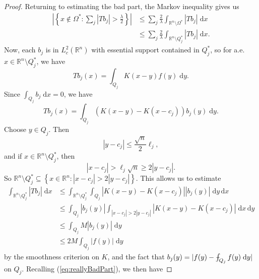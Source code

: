 \documentclass{book}
\newcommand{\bbR}{\mathbb{R}}
\renewcommand{\d}{\mathrm{d}}
\newcommand{\abs}[1]{\left\lvert {#1} \right\rvert}
\newcommand{\set}[1]{\left\{ {#1} \right\}}
\def\Xint#1{\mathchoice
{\XXint\displaystyle\textstyle{#1}}%
{\XXint\textstyle\scriptstyle{#1}}%
{\XXint\scriptstyle\scriptscriptstyle{#1}}%
{\XXint\scriptscriptstyle\scriptscriptstyle{#1}}%
\!\int}
\def\XXint#1#2#3{{\setbox0=\hbox{$#1{#2#3}{\int}$ }
\vcenter{\hbox{$#2#3$ }}\kern-.6\wd0}}
\def\dashint{\Xint-}
\theoremstyle{definition}
\theoremstyle{remark}
\numberwithin{equation}{chapter}
\begin{document}
\begin{proof}
    Returning to estimating the bad part, the Markov inequality gives us 
    \begin{equation} \begin{aligned} \label{eq:reallyBadPart}
        \abs{\set{ x \notin \Omega^* : \sum_j \abs{Tb_j} > \frac{\lambda}{2} }}
        &\leq \sum_{j} \frac{2}{\lambda} \int_{\bbR^n \setminus \Omega^*} \abs{Tb_j} \; \d{x} \\
        &\leq \sum_j \frac{2}{\lambda} \int_{\bbR^n \setminus Q_j^*} \abs{Tb_j} \; \d{x}.
    \end{aligned} \end{equation}
    Now, each $b_j$ is in $L^2_c(\bbR^n)$ with essential support contained in $Q_j^*$, so for a.e. $x \in \bbR^n \setminus Q_j^*$, we have 
    \begin{equation}
        Tb_j(x) = \int_{Q_j} K(x - y) f(y) \; \d{y}.
    \end{equation}
    Since $\int_{Q_j} b_j \; \d{x} = 0$, we have 
    \begin{equation}
        Tb_j(x) = \int_{Q_j} (K(x - y) - K(x - c_j)) b_j(y) \; \d{y}.
    \end{equation}
    Choose $y \in Q_j$. Then 
    \begin{equation}
        \abs{y - c_j} \leq \frac{\sqrt{n}}{2} \ell_j,
    \end{equation}
    and if $x \in \bbR^n \setminus Q_j^*$, then 
    \begin{equation}
        \abs{x - c_j} > \ell_j \sqrt{n} \geq 2 \abs{y - c_j}.
    \end{equation}
    So $\bbR^n \setminus Q_j^* \subseteq \set{x \in \bbR^n : \abs{x - c_j} > 2 \abs{y - c_j}}$. This allows us to estimate 
    \begin{equation} \begin{aligned}
        \int_{\bbR^n \setminus Q_j^*} \abs{Tb_j} \; \d{x} 
        &\leq \int_{\bbR^n \setminus Q_j^*} \int_{Q_j} \abs{ K(x - y) - K(x - c_j) } \abs{ b_j(y) } \; \d{y} \, \d{x} \\
        &\leq \int_{Q_j} \abs{b_j(y)} \int_{\abs{x-c_j} > 2 \abs{y-c_j}} \abs{ K(x-y) - K(x-c_j) } \; \d{x} \, \d{y} \\
        &\leq \int_{Q_j} M \abs{b_j(y)} \; \d{y} \\
        &\leq 2M \int_{Q_j} \abs{f(y)} \; \d{y}
    \end{aligned} \end{equation}
    by the smoothness criterion on $K$, and the fact that $b_j(y) = \vert f(y) - \dashint_{Q_j} f(y) \; \d{y} \vert$ on $Q_j$. Recalling (\ref{eq:reallyBadPart}), we then have 

\end{proof}
\end{document}
